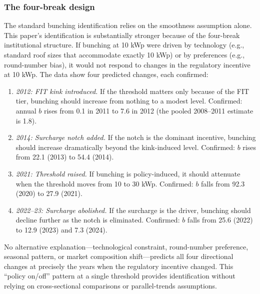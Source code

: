 \documentclass[12pt]{article}
\begin{document}
\subsubsection*{The four-break design} The standard bunching identification relies on the smoothness assumption alone. This paper's identification is substantially stronger because of the four-break institutional structure. If bunching at 10 kWp were driven by technology (e.g., standard roof sizes that accommodate exactly 10 kWp) or by preferences (e.g., round-number bias), it would not respond to changes in the regulatory incentive at 10 kWp. The data show four predicted changes, each confirmed:

\begin{enumerate}
  \item \textit{2012: FIT kink introduced.} If the threshold matters only because of the FIT tier, bunching should increase from nothing to a modest level. Confirmed: annual $b$ rises from 0.1 in 2011 to 7.6 in 2012 (the pooled 2008--2011 estimate is 1.8).
  \item \textit{2014: Surcharge notch added.} If the notch is the dominant incentive, bunching should increase dramatically beyond the kink-induced level. Confirmed: $b$ rises from 22.1 (2013) to 54.4 (2014).
  \item \textit{2021: Threshold raised.} If bunching is policy-induced, it should attenuate when the threshold moves from 10 to 30 kWp. Confirmed: $b$ falls from 92.3 (2020) to 27.9 (2021).
  \item \textit{2022--23: Surcharge abolished.} If the surcharge is the driver, bunching should decline further as the notch is eliminated. Confirmed: $b$ falls from 25.6 (2022) to 12.9 (2023) and 7.3 (2024).
\end{enumerate}

No alternative explanation---technological constraint, round-number preference, seasonal pattern, or market composition shift---predicts all four directional changes at precisely the years when the regulatory incentive changed. This ``policy on/off'' pattern at a single threshold provides identification without relying on cross-sectional comparisons or parallel-trends assumptions.
\end{document}

